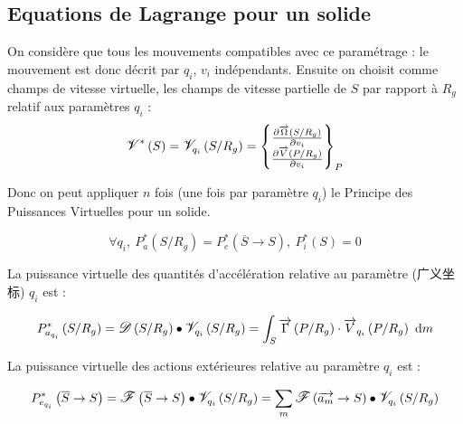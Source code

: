 \documentclass[UTF8]{ctexart}%
\begin{document}
\subsection{Equations de Lagrange pour un solide}
\label{EquationDeLagrangePourUnSolide}
On considère que tous les mouvements compatibles avec ce paramétrage : le mouvement est donc décrit par $q_i$, $v_i$ indépendants. Ensuite on choisit comme champs de vitesse virtuelle, les champs de vitesse partielle de $S$ par rapport à $R_g$ relatif aux paramètres $q_i$ :
\begin{equation}
\mathlarger{\mathscr{V}}^{\ast}\left(S\right)=\mathlarger{\mathscr{V}}_{q_i}\left(S/R_g\right)=\left\{\begin{matrix}
  \frac{\partial \overrightarrow{\Omega}\left(S/R_g\right)}{\partial v_i} \\
  \frac{\partial \overrightarrow{V}\left(P/R_g\right)}{\partial v_i}
 \end{matrix} \right\}_P
\end{equation}

Donc on peut appliquer $n$ fois (une fois par paramètre $q_i$) le Principe des Puissances Virtuelles pour un solide.

\begin{equation}
\forall q_i,\ P_a^{\ast}\left(S/R_g\right)=P_e^{\ast}\left(\overline{S}\rightarrow S\right),\ P_i^{\ast}\left(S\right)=0
\end{equation}

La puissance virtuelle des quantités d'accélération relative au paramètre (广义坐标) $q_i$ est :

\begin{equation}
P_{a_{q_i}}^{\ast}\left(S/R_g\right)=\mathlarger{\mathscr{D}}\left(S/R_g\right)\bullet\mathlarger{\mathscr{V}}_{q_i}\left(S/R_g\right)=\int_{S}\overrightarrow{\Gamma}\left(P/R_g\right)\cdot\overrightarrow{V}_{q_i}\left(P/R_g\right)\ \mathrm{d}m
\end{equation}

La puissance virtuelle des actions extérieures relative au paramètre $q_i$ est :

\begin{equation}
P_{e_{q_i}}^{\ast}\left(\overline{S}\rightarrow S\right)=\mathlarger{\mathscr{F}}\left(\overline{S}\rightarrow S\right)\bullet\mathlarger{\mathscr{V}}_{q_i}\left(S/R_g\right)=\sum_{m}\mathlarger{\mathscr{F}}\left(\overrightarrow{a_m}\rightarrow S\right)\bullet\mathlarger{\mathscr{V}}_{q_i}\left(S/R_g\right)
\end{equation}
\end{document}
